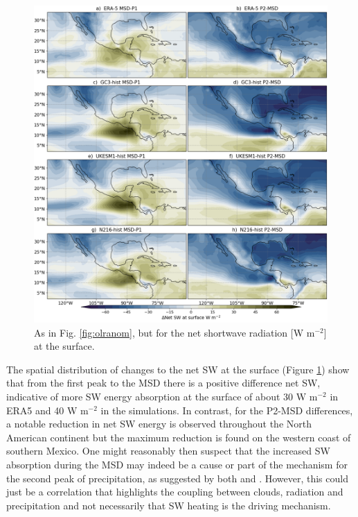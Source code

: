 \begin{figure}[t!]
\includegraphics[width=\linewidth]{figures/fig4_netswdif_3.png}
\caption[Composite shortave differences with MSD timings]{As in Fig. \ref{fig:olranom}, but for the  net shortwave radiation [W m$^{-2}$] at the surface.}
\label{fig:swnet_diff}
\end{figure}

The spatial distribution of changes to the net SW at the surface (Figure \ref{fig:swnet_diff}) show that from the first peak to the MSD there is a positive difference net SW, indicative of more SW energy absorption at the surface of about 30 W m$^{-2}$ in ERA5 and 40 W m$^{-2}$ in the simulations. In contrast, for the P2-MSD differences, a notable reduction in net SW energy is observed throughout the North American continent but the maximum reduction is found on the western coast of southern Mexico. One might reasonably then suspect that the increased SW absorption during the MSD may indeed be a cause or part of the mechanism for the second peak of precipitation, as suggested by both \cite{magana1999} and \cite{karnauskas2013}. However, this could just be a correlation that highlights the coupling between clouds, radiation and precipitation and not necessarily that SW heating is the driving mechanism.

